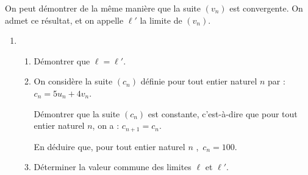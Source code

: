 On peut démontrer de la même manière que la suite $\left(v_n\right)$ est convergente. On admet ce résultat, et on appelle $\ell'$ la limite de $\left(v_n\right)$.
\begin{enumerate}[resume]
\item 
	\begin{enumerate}
		\item Démontrer que $\ell = \ell'$.
		\item On considère la suite $\left(c_n\right)$ définie pour tout entier naturel $n$ par : $c_n = 5u_n + 4v_n$.
		
Démontrer que la suite $\left(c_n\right)$ est constante, c'est-à-dire que pour tout entier naturel $n$, on a : $c_{n+1} = c_n$. 

En déduire que, pour tout entier naturel $n$ ,\, $c_n = 100$.
		\item Déterminer la valeur commune des limites  $\ell$ et $\ell'$.
	\end{enumerate}
\end{enumerate}

\bigskip

